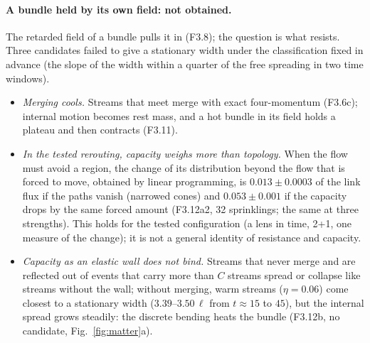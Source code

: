 \paragraph{A bundle held by its own field: not obtained.} The retarded field of a bundle pulls it in (F3.8); the
question is what resists. Three candidates failed to give a stationary width under the classification fixed in
advance (the slope of the width within a quarter of the free spreading in two time windows).
\begin{itemize}
\item \emph{Merging cools.} Streams that meet merge with exact four-momentum (F3.6c); internal motion becomes
  rest mass, and a hot bundle in its field holds a plateau and then contracts (F3.11).
\item \emph{In the tested rerouting, capacity weighs more than topology.} When the flow must avoid a region, the
  change of its distribution beyond the flow that is forced to move, obtained by linear programming, is
  $0.013\pm0.0003$ of the link flux if the paths vanish (narrowed cones) and $0.053\pm0.001$ if the capacity
  drops by the same forced amount (F3.12a2, 32 sprinklings; the same at three strengths). This holds for the
  tested configuration (a lens in time, 2+1, one measure of the change); it is not a general identity of
  resistance and capacity.
\item \emph{Capacity as an elastic wall does not bind.} Streams that never merge and are reflected out of events
  that carry more than $C$ streams spread or collapse like streams without the wall; without merging, warm
  streams ($\eta=0.06$) come closest to a stationary width ($3.39$--$3.50\,\ell$ from $t\approx15$ to $45$), but
  the internal spread grows steadily: the discrete bending heats the bundle (F3.12b, no candidate,
  Fig.~\ref{fig:matter}a).
\end{itemize}

